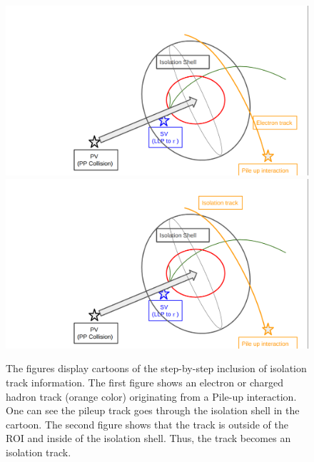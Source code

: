 \begin{figure}[h!]
  \centering
  \includegraphics[width=0.7\linewidth]{figs/ROICT7.png}
  \includegraphics[width=0.7\linewidth]{figs/ROICT8.png}
\caption{
        The figures display cartoons of the step-by-step inclusion of isolation track information.
	The first figure shows an electron or charged hadron track (orange color) originating from a Pile-up interaction.
        One can see the pileup track goes through the isolation shell in the cartoon.
        The second figure shows that the track is outside of the ROI and inside of the isolation shell.
        Thus, the track becomes an isolation track. 
	}
  \label{fig:Clustering3}
\end{figure}


%
